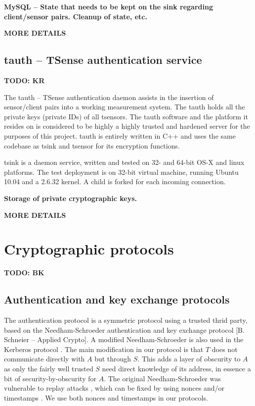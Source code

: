 \textbf{MySQL -- State that needs to be kept on the sink regarding client/sensor pairs. Cleanup of state, etc.}

\textbf{MORE DETAILS}

\subsection{tauth -- TSense authentication service}

\textbf{TODO: KR}

The tauth -- TSense authentication daemon assists in the insertion of sensor/client pairs into a working measurement system. The tauth holds all the private keys (private IDs) of all tsensors. The tauth software and the platform it resides on is considered to be highly a highly trusted and hardened server for the purposes of this project. tauth is entirely written in C++ and uses the same codebase as tsink and tsensor for its encryption functions.  

tsink is a daemon service, written and tested on 32- and 64-bit OS-X and linux platforms. The test deployment is on 32-bit virtual machine, running Ubuntu 10.04 and a 2.6.32 kernel. A child is forked for each incoming connection.

\textbf{Storage of private cryptographic keys.}

\textbf{MORE DETAILS}

\section{Cryptographic protocols}

\textbf{TODO: BK}

\subsection{Authentication and key exchange protocols}

The authentication protocol is a symmetric protocol using a trusted thrid party, based on the Needham-Schroeder authentication and key exchange protocol  [B. Schneier -- Applied Crypto]. A modified Needham-Schroeder is also used in the Kerberos protocol . The main modification in our protocol is that $T$ does not communicate directly with $A$ but through $S$. This adds a layer of obscurity to $A$ as only the fairly well trusted $S$ need direct knowledge of its address, in essence a bit of security-by-obscurity for $A$.
%
The original Needham-Schroeder was vulnerable to replay attacks , which can be fixed by using nonces and/or timestamps \cite{needham1987}. We use both nonces and timestamps in our protocols.

